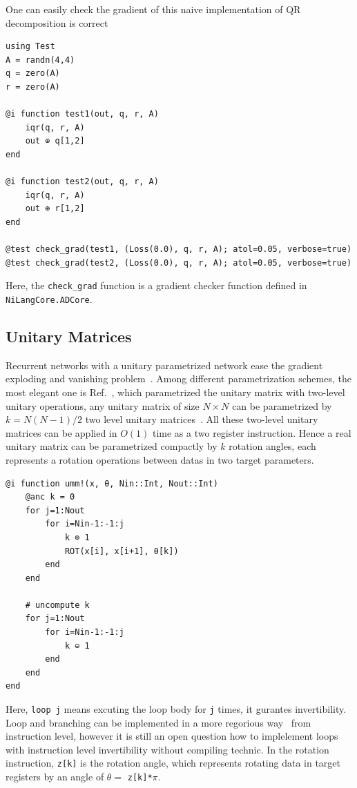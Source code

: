 \documentclass[aps,twocolumn,longbibliography,english,superscriptaddress,prr]{revtex4-1}
\newcommand{\<}{\langle}
\renewcommand{\>}{\rangle}
\newcommand{\Ref}[1]{Ref.~\onlinecite{#1}}
\begin{document}
One can easily check the gradient of this naive implementation of QR decomposition is correct
\begin{minipage}{.44\textwidth}
\begin{lstlisting}
using Test
A = randn(4,4)
q = zero(A)
r = zero(A)

@i function test1(out, q, r, A)
    iqr(q, r, A)
    out ⊕ q[1,2]
end

@i function test2(out, q, r, A)
    iqr(q, r, A)
    out ⊕ r[1,2]
end

@test check_grad(test1, (Loss(0.0), q, r, A); atol=0.05, verbose=true)
@test check_grad(test2, (Loss(0.0), q, r, A); atol=0.05, verbose=true)
\end{lstlisting}
\end{minipage}

Here, the \texttt{check\_grad} function is a gradient checker function defined in \texttt{NiLangCore.ADCore}.

\subsection{Unitary Matrices}
Recurrent networks with a unitary parametrized network ease the gradient exploding and vanishing problem~\cite{Arjovsky2015,Wisdom2016,Li2016}.
Among different parametrization schemes, the most elegant one is \Ref{Li2016}, which parametrized the unitary matrix with two-level unitary operations, any unitary matrix of size $N\times N$ can be parametrized by $k = N(N-1)/2$ two level unitary matrices~\cite{Li2013}. All these two-level unitary matrices can be applied in $O(1)$ time as a two register instruction.
Hence a real unitary matrix can be parametrized compactly by $k$ rotation angles, each represents a rotation operations between datas in two target parameters.


\begin{minipage}{.44\textwidth}
\begin{lstlisting}[basicstyle=\small\ttfamily,columns=fullflexible]
@i function umm!(x, θ, Nin::Int, Nout::Int)
    @anc k = 0
    for j=1:Nout
        for i=Nin-1:-1:j
            k ⊕ 1
            ROT(x[i], x[i+1], θ[k])
        end
    end

    # uncompute k
    for j=1:Nout
        for i=Nin-1:-1:j
            k ⊖ 1
        end
    end
end
\end{lstlisting}
\end{minipage}

Here, \texttt{loop j} means excuting the loop body for \texttt{j} times, it gurantes invertibility.
Loop and branching can be implemented in a more regorious way~\cite{Vieri1999} from instruction level,
however it is still an open question how to implelement loops with instruction level invertibility without compiling technic.
In the rotation instruction, \texttt{z[k]} is the rotation angle, which represents rotating data in target registers by an angle of $\theta=$ \texttt{z[k]*$\pi$}.
\end{document}
